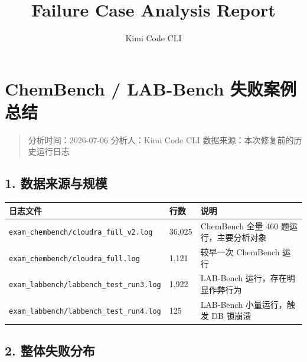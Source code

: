 \documentclass[
]{achemso}
\title{Failure Case Analysis Report}
\author{Kimi Code CLI}
\date{}
\begin{document}
\maketitle

\hypertarget{chembench-lab-bench-ux5931ux8d25ux6848ux4f8bux603bux7ed3}{%
\section{ChemBench / LAB-Bench
失败案例总结}\label{chembench-lab-bench-ux5931ux8d25ux6848ux4f8bux603bux7ed3}}

\begin{quote}
分析时间：2026-07-06 分析人：Kimi Code CLI
数据来源：本次修复前的历史运行日志
\end{quote}

\hypertarget{ux6570ux636eux6765ux6e90ux4e0eux89c4ux6a21}{%
\subsection{1.
数据来源与规模}\label{ux6570ux636eux6765ux6e90ux4e0eux89c4ux6a21}}

\begin{longtable}[]{@{}lll@{}}
\toprule
日志文件 & 行数 & 说明 \\
\midrule
\endhead
\texttt{exam\_chembench/cloudra\_full\_v2.log} & 36,025 & ChemBench 全量
460 题运行，主要分析对象 \\
\texttt{exam\_chembench/cloudra\_full.log} & 1,121 & 较早一次 ChemBench
运行 \\
\texttt{exam\_labbench/labbench\_test\_run3.log} & 1,922 & LAB-Bench
运行，存在明显作弊行为 \\
\texttt{exam\_labbench/labbench\_test\_run4.log} & 125 & LAB-Bench
小量运行，触发 DB 锁崩溃 \\
\bottomrule
\end{longtable}

\hypertarget{ux6574ux4f53ux5931ux8d25ux5206ux5e03}{%
\subsection{2.
整体失败分布}\label{ux6574ux4f53ux5931ux8d25ux5206ux5e03}}
\end{document}
